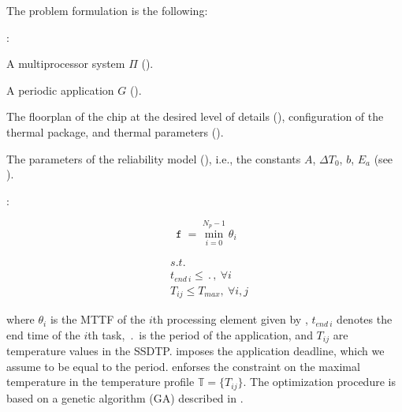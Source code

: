 The problem formulation is the following:

:
\begin{ilist}
  \item A multiprocessor system $\Pi$ ().
  \item A periodic application $G$ ().
  \item The floorplan of the chip at the desired level of details (), configuration of the thermal package, and thermal parameters ().
  \item The parameters of the reliability model (), i.e., the constants $A$, $\Delta T_0$, $b$, $E_a$ (see ).
\end{ilist}

:\vspace{-5pt}

\begin{minipage}{0.35\linewidth}
  \begin{equation} \label{eq:fitness-function}
    \mttf = \min_{i = 0}^{N_p - 1} \theta_i
  \end{equation}
\end{minipage}
\begin{minipage}{0.6\linewidth}
  \begin{align}
    & s.t. \nonumber \\
    & t_{end \: i} \leq \period, \: \forall i \label{eq:deadline} \\
    & T_{ij} \leq T_{max}, \: \forall i, j \label{eq:t-max}
  \end{align}
\end{minipage}\vspace{5pt}
where $\theta_i$ is the MTTF of the $i$th processing element given by , $t_{end \: i}$ denotes the end time of the $i$th task, $\period$ is the period of the application, and $T_{ij}$ are temperature values in the SSDTP.  imposes the application deadline, which we assume to be equal to the period.  enforses the constraint on the maximal temperature in the temperature profile $\mathbb{T} = \{ T_{ij} \}$. The optimization procedure is based on a genetic algorithm (GA) described in .

